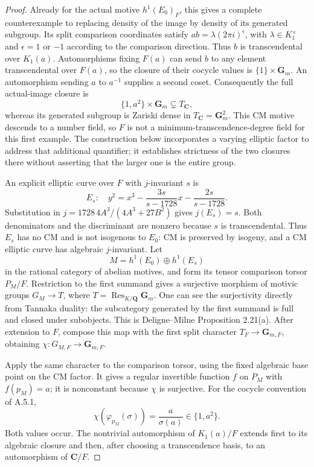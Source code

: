 \begin{proof}
Already for the actual motive \(h^1(E_0)_F\), this gives a complete
counterexample to replacing density of the image by density of its
generated subgroup. Its split comparison coordinates satisfy
\(ab=\lambda(2\pi i)^{\epsilon}\), with
\(\lambda\in K_1^\times\) and \(\epsilon=1\) or \(-1\) according to
the comparison direction. Thus \(b\) is transcendental over
\(K_1(a)\). Automorphisms fixing \(F(a)\) can send \(b\) to any
element transcendental over \(F(a)\), so the closure of their cocycle
values is \(\{1\}\times\mathbf G_m\). An automorphism sending
\(a\) to \(a^{-1}\) supplies a second coset. Consequently the full
actual-image closure is
\[
\{1,a^2\}\times\mathbf G_m\subsetneq T_{\mathbf C},
\]
whereas its generated subgroup is Zariski dense in
\(T_{\mathbf C}=\mathbf G_m^2\). This CM motive descends to a number
field, so \(F\) is not a minimum-transcendence-degree field for this
first example. The construction below incorporates a varying elliptic
factor to address that additional quantifier; it establishes strictness
of the two closures there without asserting that the larger one is the
entire group.

An explicit elliptic curve over \(F\) with \(j\)-invariant \(s\) is
\[
E_s:\quad y^2=x^3-\frac{3s}{s-1728}x-\frac{2s}{s-1728}.
\]
Substitution in \(j=1728\,4A^3/(4A^3+27B^2)\) gives \(j(E_s)=s\).
Both denominators and the discriminant are nonzero because \(s\) is
transcendental. Thus \(E_s\) has no CM and is not isogenous to \(E_0\):
CM is preserved by isogeny, and a CM elliptic curve has algebraic
\(j\)-invariant. Let
\[
M=h^1(E_0)\oplus h^1(E_s)
\]
in the rational category of abelian motives, and form its tensor
comparison torsor \(P_M/F\). Restriction to the first summand gives a
surjective morphism of motivic groups \(G_M\to T\), where
\(T=\operatorname{Res}_{K/\mathbf Q}\mathbf G_m\). One can see the
surjectivity directly from Tannaka duality: the subcategory generated by
the first summand is full and closed under subobjects. This is
Deligne--Milne Proposition 2.21(a). After extension to \(F\), compose this
map with the first split character \(T_F\to\mathbf G_{m,F}\), obtaining
\(\chi:G_{M,F}\to\mathbf G_{m,F}\).

Apply the same character to the comparison torsor, using the fixed
algebraic base point on the CM factor. It gives a regular invertible
function \(f\) on \(P_M\) with \(f(p_M)=a\); it is nonconstant because
\(\chi\) is surjective. For the cocycle convention of A.5.1,
\[
\chi(\varphi_{p_M}(\sigma))
=\frac{a}{\sigma(a)}\in\{1,a^2\}.
\tag{A.5.4.1}
\]
Both values occur. The nontrivial automorphism of \(K_1(a)/F\) extends
first to its algebraic closure and then, after choosing a transcendence
basis, to an automorphism of \(\mathbf C/F\).


\end{proof}
